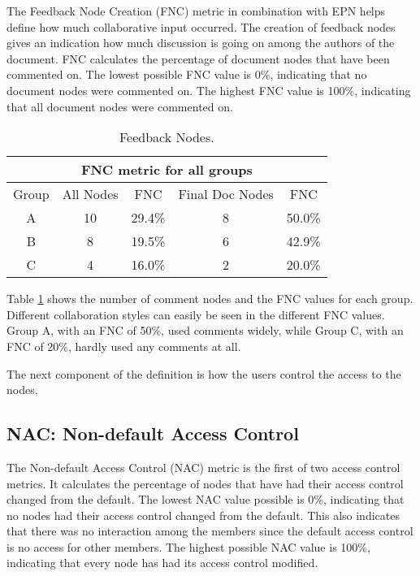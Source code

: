 The Feedback Node Creation (FNC) metric in combination with EPN helps define
how much collaborative input occurred. The creation of feedback nodes gives
an indication how much discussion is going on among the authors of the
document.  FNC calculates the percentage of document nodes that have been
commented on. The lowest possible FNC value is 0\%, indicating that no
document nodes were commented on.  The highest FNC value is 100\%,
indicating that all document nodes were commented on.  
\small
\begin{table}[htb]
  \caption{Feedback Nodes.}
  \begin{center}
    \begin{tabular}{|c|c|c||c|c|}
      \hline
      \multicolumn{5}{|c|}{\rule[-3mm]{0mm}{8mm}\bf FNC metric for
      all groups}\\ \hline
      Group&All Nodes&FNC&Final Doc Nodes&FNC\\ \hline
      \hline
      A&10&29.4\%&8&50.0\%\\ \hline
      B&8&19.5\%&6&42.9\%\\ \hline
      C&4&16.0\%&2&20.0\%\\ \hline
    \end{tabular}
  \end{center}
  \label{tab:feedback}
\end{table}
\normalsize

Table \ref{tab:feedback} shows the number of comment nodes and the FNC
values for each group.  Different collaboration styles can easily be seen
in the different FNC values.  Group A, with an FNC of 50\%, used comments
widely, while Group C, with an FNC of 20\%, hardly used any comments
at all. 

The next component of the definition is how the users control the access to
the nodes.

\subsection{NAC: Non-default Access Control}

The Non-default Access Control (NAC) metric is the first of two access
control metrics.  It calculates the percentage of nodes that have had their
access control changed from the default.  The lowest NAC value possible is
0\%, indicating that no nodes had their access control changed from the
default.  This also indicates that there was no interaction among the
members since the default access control is no access for other members.
The highest possible NAC value is 100\%, indicating that every node has had
its access control modified.

